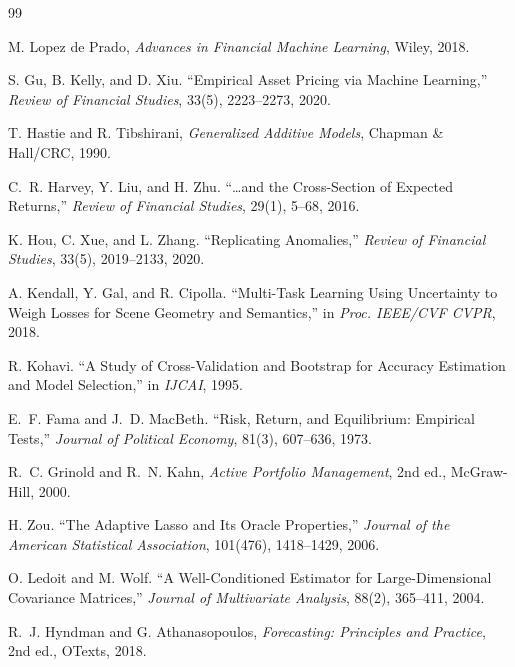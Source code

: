 \documentclass[11pt]{article}
\begin{document}

\begin{thebibliography}{99}

M. Lopez de Prado, \emph{Advances in Financial Machine Learning},
Wiley, 2018.

S. Gu, B. Kelly, and D. Xiu. ``Empirical Asset Pricing via Machine
Learning,'' \emph{Review of Financial Studies}, 33(5), 2223--2273, 2020.

T. Hastie and R. Tibshirani, \emph{Generalized Additive Models},
Chapman \& Hall/CRC, 1990.

C.~R. Harvey, Y. Liu, and H. Zhu. ``\dots and the Cross-Section
of Expected Returns,'' \emph{Review of Financial Studies}, 29(1),
5--68, 2016.

K. Hou, C. Xue, and L. Zhang. ``Replicating Anomalies,''
\emph{Review of Financial Studies}, 33(5), 2019--2133, 2020.

A. Kendall, Y. Gal, and R. Cipolla. ``Multi-Task Learning Using
Uncertainty to Weigh Losses for Scene Geometry and Semantics,''
in \emph{Proc. IEEE/CVF CVPR}, 2018.

R. Kohavi. ``A Study of Cross-Validation and Bootstrap for Accuracy
Estimation and Model Selection,'' in \emph{IJCAI}, 1995.

E.~F. Fama and J.~D. MacBeth. ``Risk, Return, and Equilibrium:
Empirical Tests,'' \emph{Journal of Political Economy}, 81(3),
607--636, 1973.

R.~C. Grinold and R.~N. Kahn, \emph{Active Portfolio Management},
2nd ed., McGraw-Hill, 2000.

H. Zou. ``The Adaptive Lasso and Its Oracle Properties,''
\emph{Journal of the American Statistical Association}, 101(476),
1418--1429, 2006.

O. Ledoit and M. Wolf. ``A Well-Conditioned Estimator for
Large-Dimensional Covariance Matrices,'' \emph{Journal of Multivariate
Analysis}, 88(2), 365--411, 2004.

R.~J. Hyndman and G. Athanasopoulos, \emph{Forecasting: Principles
and Practice}, 2nd ed., OTexts, 2018.

\end{thebibliography}
\end{document}
